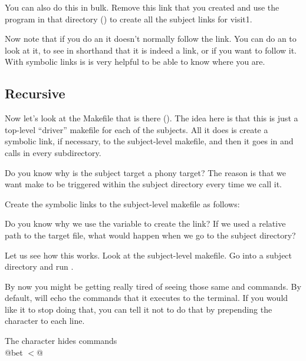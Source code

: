 You can also do this in bulk. Remove this link that you created and
use the program in that directory () to create all the subject links for visit1. 

Now note that if you do an  it doesn't normally follow the
link. You can do an  to look at it,  to see
in shorthand that it is indeed a link, or  if you want to follow
it. With symbolic links is is very helpful to be able to know where
you are.

\subsection{Recursive \maken{}}
Now let’s look at the Makefile that is there
().  The idea here is that this is just a
top-level “driver” makefile for each of the subjects. All it does is
create a symbolic link, if necessary, to the subject-level makefile,
and then it goes in and calls \maken{} in every subdirectory.

Do you know why is the subject target a phony target? The reason is
that we want make to be triggered within the subject directory every
time we call it.

Create the symbolic links to the subject-level makefile as follows:

Do you know why we use the  variable to create the link?
If we used a relative path to the target file, what would happen when
we go to the subject directory?

Let us see how this works. Look at the subject-level makefile. Go into
a subject directory and run .

By now you might be getting really tired of seeing those same
 and  commands. By default, \maken{}
will echo the commands that it executes to the terminal. If you would
like it to stop doing that, you can tell it not to do that by
prepending the  character to each line.
\begin{make}{The  character hides commands}
\\
  \tab @bet $< $@ \\
\end{make}

